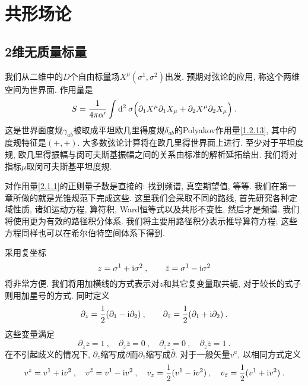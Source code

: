 
\chapter{\texorpdfstring{共形场论}{2 Conformal field theory}} \label{cha:2}

\section{\texorpdfstring{2维无质量标量}{2.1 Massless scalars in two dimensions}} \label{sec:2.1}
我们从二维中的$D$个自由标量场$X^{\mu}(\sigma^{1}, \sigma^{2})$出发. 预期对弦论的应用, 称这个两维空间为世界面. 作用量是
\begin{equation}
S=\frac{1}{4 \pi \alpha^{\prime}} \int \mathrm{d}^{2} \: \sigma
\Bigl(\partial_{1} X^{\mu} \partial_{1} X_{\mu}+\partial_{2} X^{\mu} \partial_{2} X_{\mu}\Bigr) \:. \label{2.1.1}
\end{equation}
这是世界面度规$\gamma_{a b}$被取成平坦欧几里得度规$\delta_{a b}$的Polyakov作用量\eqref{1.2.13}, 其中的度规特征是$(+,+)$. 
大多数弦论计算将在欧几里得世界面上进行. 至少对于平坦度规, 欧几里得振幅与闵可夫斯基振幅之间的关系由标准的解析延拓给出. 
我们将对指标$\mu$取闵可夫斯基平坦度规.

对作用量\eqref{2.1.1}的正则量子数是直接的: 找到频谱, 真空期望值, 等等. 我们在第一章所做的就是光锥规范下完成这些. 
这里我们会采取不同的路线, 首先研究各种定域性质, 诸如运动方程, 算符积, Ward恒等式以及共形不变性, 然后才是频谱. 
我们将使用更为有效的路径积分体系. 我们将主要用路径积分表示推导算符方程; 这些方程同样也可以在希尔伯特空间体系下得到.

采用复坐标
\begin{equation}
z=\sigma^{1}+ \mathrm{i} \sigma^{2} \:, \qquad \bar{z}=\sigma^{1}- \mathrm{i} \sigma^{2} \label{2.1.2}
\end{equation}
将非常方便. 我们将用加横线的方式表示对$z$和其它复变量取共轭, 对于较长的式子则用加星号的方式. 同时定义
\begin{equation}
\partial_{z}=\frac{1}{2}(\partial_{1}- \mathrm{i} \partial_{2}) \:, \qquad \partial_{\bar{z}}=\frac{1}{2}(\partial_{1}+ \mathrm{i} \partial_{2}) \:. \label{2.1.3}
\end{equation}
这些变量满足
\begin{equation}
\partial_{z} z=1 \:, \quad \partial_{z} \bar{z}=0 \:, \quad \partial_{\bar{z}} z=0 \:, \quad \partial_{\bar{z}} \bar{z}=1
\:. \label{2.1.4}
\end{equation}
在不引起歧义的情况下, $\partial_{z}$缩写成$\partial$而$\partial_{\bar{z}}$缩写成$\bar{\partial}$. 对于一般矢量$v^{a}$, 以相同方式定义
\begin{equation}
v^{z}=v^{1}+ \mathrm{i} v^{2} \:, \quad v^{\bar{z}}=v^{1}- \mathrm{i} v^{2} \:, \quad v_{z}=\frac{1}{2}(v^{1}-\mathrm{i} v^{2}) \:, \quad v_{\bar{z}}=\frac{1}{2}(v^{1}+ \mathrm{i} v^{2}) \:. \label{2.1.5}
\end{equation}

